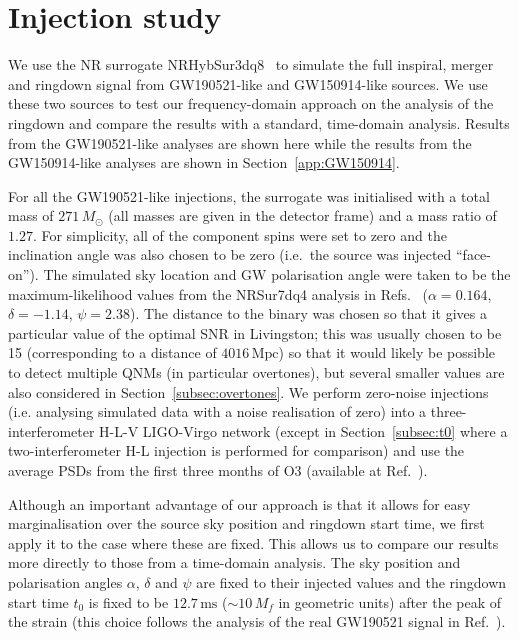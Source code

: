 \section{Injection study}\label{sec:injection_study}

We use the NR surrogate NRHybSur3dq8~\cite{Varma:2018mmi} to simulate the full inspiral, merger and ringdown signal from GW190521-like and GW150914-like sources. 
We use these two sources to test our frequency-domain approach on the analysis of the ringdown and compare the results with a standard, time-domain analysis.
Results from the GW190521-like analyses are shown here while the results from the GW150914-like analyses are shown in Section~\ref{app:GW150914}.

For all the GW190521-like injections, the surrogate was initialised with a total mass of $271\,M_\odot$ (all masses are given in the detector frame) and a mass ratio of $1.27$. 
For simplicity, all of the component spins were set to zero and the inclination angle was also chosen to be zero (i.e.\ the source was injected ``face-on'').
The simulated sky location and GW polarisation angle were taken to be the maximum-likelihood values from the NRSur7dq4 analysis in Refs.~\cite{LIGOScientific:2020ibl, gwtc2datarelease} ($\alpha = 0.164$, $\delta = -1.14$, $\psi = 2.38$).
The distance to the binary was chosen so that it gives a particular value of the optimal SNR in Livingston; this was usually chosen to be 15 (corresponding to a distance of $4016\,\mathrm{Mpc}$) so that it would likely be possible to detect multiple QNMs (in particular overtones), but several smaller values are also considered in Section~\ref{subsec:overtones}.
We perform zero-noise injections (i.e. analysing simulated data with a noise realisation of zero) into a three-interferometer H-L-V LIGO-Virgo network (except in Section~\ref{subsec:t0} where a two-interferometer H-L injection is performed for comparison) and use the average PSDs from the first three months of O3 (available at Ref.~\cite{o3psd}).

Although an important advantage of our approach is that it allows for easy marginalisation over the source sky position and ringdown start time, we first apply it to the case where these are fixed. 
This allows us to compare our results more directly to those from a time-domain analysis.
The sky position and polarisation angles $\alpha$, $\delta$ and $\psi$ are fixed to their injected values and the ringdown start time $t_0$ is fixed to be $12.7\,\mathrm{ms}$ ($\sim 10\,M_f$ in geometric units) after the peak of the strain (this choice follows the analysis of the real GW190521 signal in Ref.~\cite{LIGOScientific:2020iuh}).

